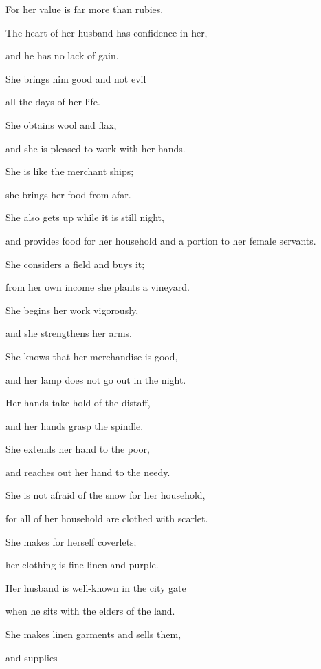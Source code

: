 {\par }{\Q For her value
is far more
than rubies.
\par }{\Q {}The heart
of her husband
has confidence
in her,
\par }{\Q and he has no
lack
of gain.
\par }{\Q {}She brings
him good
and not
evil
\par }{\Q all
the days
of her life.
\par }{\Q {}She obtains
wool
and flax,
\par }{\Q and she is pleased
to work with her hands.
\par }{\Q {}She is like
the merchant
ships;
\par }{\Q she brings
her food
from afar.
\par }{\Q {}She
also gets up
while it is still
night,
\par }{\Q and provides
food for her household
and a portion
to her female servants.
\par }{\Q {}She considers
a field
and buys
it;
\par }{\Q from her own income
she plants
a vineyard.
\par }{\Q {}She begins
her work
vigorously,
\par }{\Q and she strengthens
her arms.
\par }{\Q {}She knows
that
her merchandise
is good,
\par }{\Q and her lamp
does not
go out
in the night.
\par }{\Q {}Her hands
take hold of the distaff,
\par }{\Q and her hands
grasp the spindle.
\par }{\Q {}She extends
her hand
to the poor,
\par }{\Q and reaches
out her hand
to the needy.
\par }{\Q {}She is not
afraid
of the snow
for her household,
\par }{\Q for
all
of her household
are clothed
with scarlet.
\par }{\Q {}She makes for herself coverlets;
\par }{\Q her clothing
is fine linen
and purple.
\par }{\Q {}Her husband
is well-known
in the city gate
\par }{\Q when he sits
with
the elders
of the land.
\par }{\Q {}She makes linen
garments and sells
them,
\par }{\Q and supplies
}
